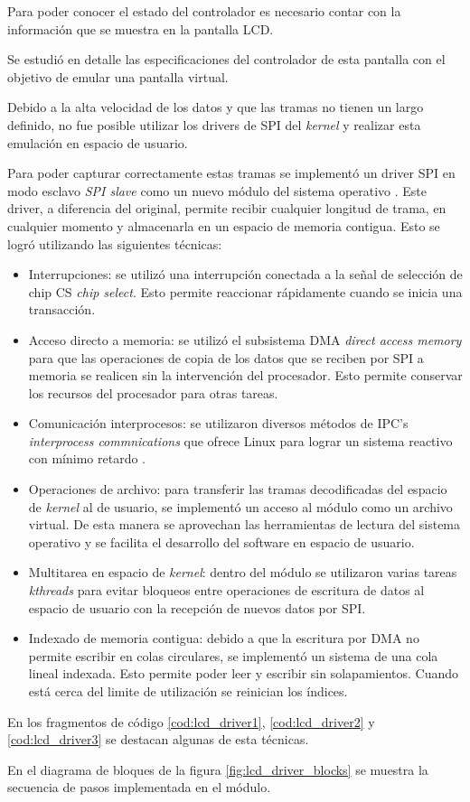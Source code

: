       Para poder conocer el estado del controlador es necesario contar con la información que se muestra en la pantalla LCD.\par
      Se estudió en detalle las especificaciones del controlador de esta pantalla con el objetivo de emular una pantalla virtual.\par
      Debido a la alta velocidad de los datos y que las tramas no tienen un largo definido, no fue posible utilizar los drivers de SPI del \textit{kernel} y realizar esta emulación en espacio de usuario.\par
      Para poder capturar correctamente estas tramas se implementó un driver SPI en modo esclavo \textit{SPI slave} como un nuevo módulo del sistema operativo \citep{book:ldd3}.
      Este driver, a diferencia del original, permite recibir cualquier longitud de trama, en cualquier momento y almacenarla en un espacio de memoria contigua.
      Esto se logró utilizando las siguientes técnicas:
      \begin{itemize}
         \item {Interrupciones: se utilizó una interrupción conectada a la señal de selección de chip CS \textit{chip select}. Esto permite reaccionar rápidamente cuando se inicia una transacción.}
         \item {Acceso directo a memoria: se utilizó el subsistema DMA \textit{direct access memory} para que las operaciones de copia de los datos que se reciben por SPI a memoria se realicen sin la intervención del procesador. Esto permite conservar los recursos del procesador para otras tareas.}
         \item{Comunicación interprocesos: se utilizaron diversos métodos de IPC's \textit{interprocess commnications} que ofrece Linux para lograr un sistema reactivo con mínimo retardo \citep{book:ldd3}.}
         \item{Operaciones de archivo: para transferir las tramas decodificadas del espacio de \textit{kernel} al de usuario, se implementó un acceso al módulo como un archivo virtual. De esta manera se aprovechan las herramientas de lectura del sistema operativo y se facilita el desarrollo del software en espacio de usuario.}
         \item{Multitarea en espacio de \textit{kernel}: dentro del módulo se utilizaron varias tareas \textit{kthreads} para evitar bloqueos entre operaciones de escritura de datos al espacio de usuario con la recepción de nuevos datos por SPI.}
         \item{Indexado de memoria contigua: debido a que la escritura por DMA no permite escribir en colas circulares, se implementó un sistema de una cola lineal indexada. Esto permite poder leer y escribir sin solapamientos. Cuando está cerca del limite de utilización se reinician los índices.}
      \end{itemize}
      En los fragmentos de código \ref{cod:lcd_driver1}, \ref{cod:lcd_driver2} y \ref{cod:lcd_driver3} se destacan algunas de esta técnicas.\par
      En el diagrama de bloques de la figura \ref{fig:lcd_driver_blocks} se muestra la secuencia de pasos implementada en el módulo.
      
